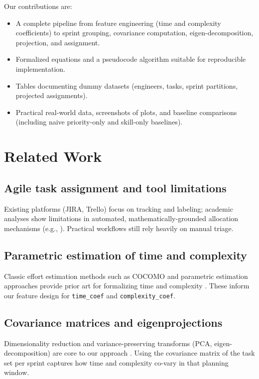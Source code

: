 \documentclass[journal]{IEEEtran}
\begin{document}
Our contributions are:
\begin{itemize}[leftmargin=*]
    \item A complete pipeline from feature engineering (time and complexity coefficients) to sprint grouping, covariance computation, eigen-decomposition, projection, and assignment.
    \item Formalized equations and a pseudocode algorithm suitable for reproducible implementation.
    \item Tables documenting dummy datasets (engineers, tasks, sprint partitions, projected assignments).
    \item Practical real-world data, screenshots of plots, and baseline comparisons (including naive priority-only and skill-only baselines).
\end{itemize}

\section{Related Work}\label{sec:related}
\subsection{Agile task assignment and tool limitations}
Existing platforms (JIRA, Trello) focus on tracking and labeling; academic analyses show limitations in automated, mathematically-grounded allocation mechanisms (e.g., \cite{jira_assignment}). Practical workflows still rely heavily on manual triage.

\subsection{Parametric estimation of time and complexity}
Classic effort estimation methods such as COCOMO and parametric estimation approaches provide prior art for formalizing time and complexity \cite{cocomo, parametric_estimate}. These inform our feature design for \texttt{time\_coef} and \texttt{complexity\_coef}.

\subsection{Covariance matrices and eigenprojections}
Dimensionality reduction and variance-preserving transforms (PCA, eigen-decomposition) are core to our approach \cite{pca2017, eigen_projection}. Using the covariance matrix of the task set per sprint captures how time and complexity co-vary in that planning window.
\end{document}

